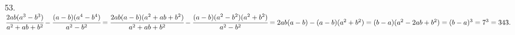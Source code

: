 53. $\cfrac{2ab(a^3-b^3)}{a^2+ab+b^2}-\cfrac{(a-b)(a^4-b^4)}{a^2-b^2}=
\cfrac{2ab(a-b)(a^2+ab+b^2)}{a^2+ab+b^2}-\cfrac{(a-b)(a^2-b^2)(a^2+b^2)}{a^2-b^2}=
2ab(a-b)-(a-b)(a^2+b^2)=(b-a)(a^2-2ab+b^2)=(b-a)^3=7^3=343.$
\newpage

